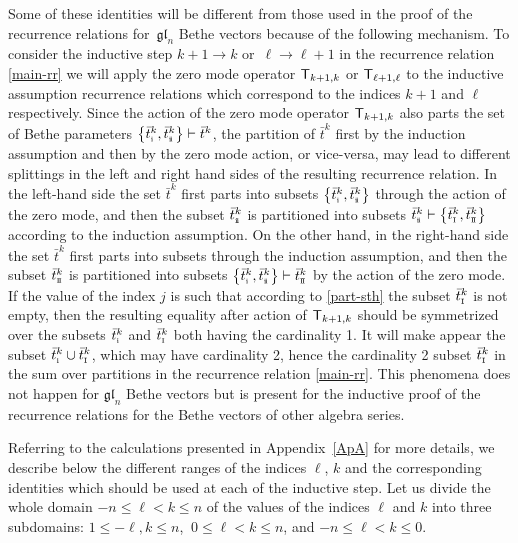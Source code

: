 \documentclass[pdftex]{sigma}
\newcommand{\so}{\scriptscriptstyle \rm I}
\newcommand{\st}{\scriptscriptstyle \rm I\hspace{-1pt}I}
\newcommand{\sso}{\scriptscriptstyle \rm i}
\newcommand{\sst}{\scriptscriptstyle \rm i\hspace{-1pt}i}
\newcommand{\bt}{{\bar t}}
\theoremstyle{definition}
\def\r#1{\eqref{#1}}
\def\sT{{\sf T}}
\begin{document}
Some of these identities will be different from those used in the proof of
the recurrence relations for~$\mathfrak{gl}_n$ Bethe vectors because of the following
mechanism. To consider the inductive step $k+1\to k$ or~${\ell\to \ell+1}$
in the recurrence relation \r{main-rr} we will apply the zero mode operator
$\sT_{k+1,k}$ or $\sT_{\ell+1,\ell}$ to the inductive assumption
recurrence relations which correspond to the indices $k+1$
and $\ell$ respectively. Since the action of the zero mode operator
$\sT_{k+1,k}$ also parts the set of Bethe parameters
$\bigl\{\bt^k_{\sso},\bt^k_{\sst}\bigr\}\vdash\bt^k$, the partition of $\bt^k$ first by the induction assumption and then by the zero mode action, or vice-versa,
 may lead to different splittings in the left and right hand sides of the resulting recurrence
relation. In the left-hand side the set $\bt^k$ first parts into subsets
$\bigl\{\bt^k_{\sso},\bt^k_{\sst}\bigr\} $ through the action of the zero mode, and then the subset $\bt^k_{\sst}$ is partitioned
into subsets $\bt^k_{\sst}\vdash\bigl\{\bt^k_{\so},\bt^k_{\st}\bigr\}$ according to
the induction assumption. On the other hand, in the right-hand side the set
$\bt^k$ first parts into subsets
\smash{$\bigl\{\bt^k_{\so},\bt^k_{\st}\bigr\} $} through the induction assumption, and then the subset $\bt^k_{\st}$ is partitioned
into subsets $\bigl\{\bt^k_{\sso},\bt^k_{\sst}\bigr\}\vdash\bt^k_{\st}$
by the action of the zero mode.
If the value of the index $j$ is such that according to \r{part-sth}
the subset $\bt^k_{\so}$ is not empty, then the resulting equality after
action of $\sT_{k+1,k}$ should be symmetrized over the subsets
$\bt^k_{\sso}$ and $\bt^k_{\so}$ both having the cardinality 1.
It will make appear the subset $\bt^k_{\sso}\cup\bt^k_{\so}$, which may have cardinality 2, hence
 the cardinality 2 subset
$\bt^k_{\so}$ in the sum over partitions in the recurrence relation \r{main-rr}.
This phenomena does not happen for $\mathfrak{gl}_n$ Bethe vectors
but is present for the inductive proof of the recurrence relations
for the Bethe vectors of other algebra series.


Referring to the calculations presented in Appendix~\ref{ApA} for more details,
we describe below the different ranges of the indices $\ell$, $k$ and the
corresponding identities which should be used at each of the inductive step.
Let us divide the whole domain $-n\leq \ell< k\leq n$
of the values of the indices $\ell$ and $k$
 into three subdomains:
$1\leq-\ell,k\leq n$, $\ 0\leq \ell< k\leq n$, and
$-n\leq \ell< k\leq 0$.
\end{document}
